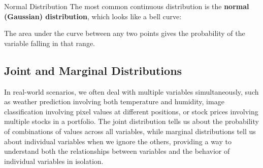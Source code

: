 \begin{examplebox}{Normal Distribution}
The most common continuous distribution is the \textbf{normal (Gaussian) distribution}, which looks like a bell curve:

\begin{center}
\end{center}

The area under the curve between any two points gives the probability of the variable falling in that range.

\begin{center}
\end{center}
\end{examplebox}

\subsection{Joint and Marginal Distributions}

In real-world scenarios, we often deal with multiple variables simultaneously, such as weather prediction involving both temperature and humidity, image classification involving pixel values at different positions, or stock prices involving multiple stocks in a portfolio. The joint distribution tells us about the probability of combinations of values across all variables, while marginal distributions tell us about individual variables when we ignore the others, providing a way to understand both the relationships between variables and the behavior of individual variables in isolation.

